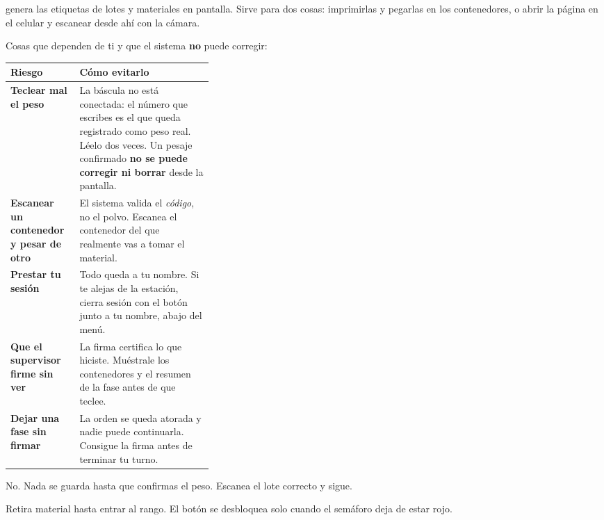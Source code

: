 
 genera las etiquetas de lotes y materiales en pantalla.
Sirve para dos cosas: imprimirlas y pegarlas en los contenedores, o abrir la página
en el celular y escanear desde ahí con la cámara.

\newpage
{}

Cosas que dependen de ti y que el sistema \textbf{no} puede corregir:

\begin{center}
\begin{tabularx}{\linewidth}{@{}p{0.34\linewidth} >{\raggedright\arraybackslash}X@{}}
\toprule
\textbf{Riesgo} & \textbf{Cómo evitarlo} \\
\midrule
\textbf{Teclear mal el peso} & La báscula no está conectada: el número que escribes es el que queda registrado como peso real. Léelo dos veces. Un pesaje confirmado \textbf{no se puede corregir ni borrar} desde la pantalla. \\
\textbf{Escanear un contenedor y pesar de otro} & El sistema valida el \textit{código}, no el polvo. Escanea el contenedor del que realmente vas a tomar el material. \\
\textbf{Prestar tu sesión} & Todo queda a tu nombre. Si te alejas de la estación, cierra sesión con el botón junto a tu nombre, abajo del menú. \\
\textbf{Que el supervisor firme sin ver} & La firma certifica lo que hiciste. Muéstrale los contenedores y el resumen de la fase antes de que teclee. \\
\textbf{Dejar una fase sin firmar} & La orden se queda atorada y nadie puede continuarla. Consigue la firma antes de terminar tu turno. \\
\bottomrule
\end{tabularx}
\end{center}

\newpage
{}

No. Nada se guarda hasta que confirmas el peso. Escanea el lote correcto y sigue.

Retira material hasta entrar al rango. El botón se desbloquea solo cuando el
semáforo deja de estar rojo.

